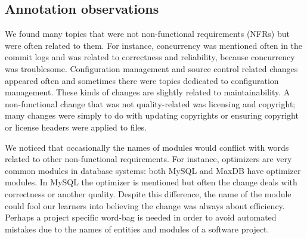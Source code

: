 \documentclass[]{sig-alternate}
\begin{document}

\subsection{Annotation observations}

We found many topics that were not non-functional requirements (NFRs) but were often related to them. For instance, concurrency was mentioned often in the commit logs and was related to correctness and reliability, because concurrency was troublesome. Configuration management and source control related changes appeared often and sometimes there were topics dedicated to configuration management. These kinds of changes are slightly related to maintainability. A non-functional change that was not quality-related was licensing and copyright; many changes were simply to do with updating copyrights or ensuring copyright or license headers were applied to files.

We noticed that occasionally the names of modules would conflict with words related to other non-functional requirements. For instance, optimizers are very common modules in database systems: both MySQL and MaxDB have optimizer modules. In MySQL the optimizer is mentioned but often the change deals with correctness or another quality. Despite this difference, the name of the module could fool our learners into believing the change was always about efficiency. Perhaps a project specific word-bag is needed in order to avoid automated mistakes due to the names of entities and modules of a software project.

\end{document}
